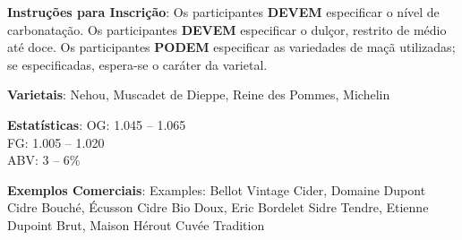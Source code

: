 \textbf{Instruções para Inscrição}: Os participantes \textbf{DEVEM} especificar o nível de carbonatação. Os participantes \textbf{DEVEM} especificar o dulçor, restrito de médio até doce. Os participantes \textbf{PODEM} especificar as variedades de maçã utilizadas; se especificadas, espera-se o caráter da varietal.

\textbf{Varietais}: Nehou, Muscadet de Dieppe, Reine des Pommes, Michelin

\textbf{Estatísticas}: OG: 1.045 – 1.065 \\
\phantom{ } \hspace{16.5mm} FG: 1.005 – 1.020 \\
\phantom{ } \hspace{16.5mm} ABV: 3 – 6\%

\textbf{Exemplos Comerciais}: Examples: Bellot Vintage Cider, Domaine Dupont Cidre Bouché, Écusson Cidre Bio Doux, Eric Bordelet Sidre Tendre, Etienne Dupoint Brut, Maison Hérout Cuvée Tradition
